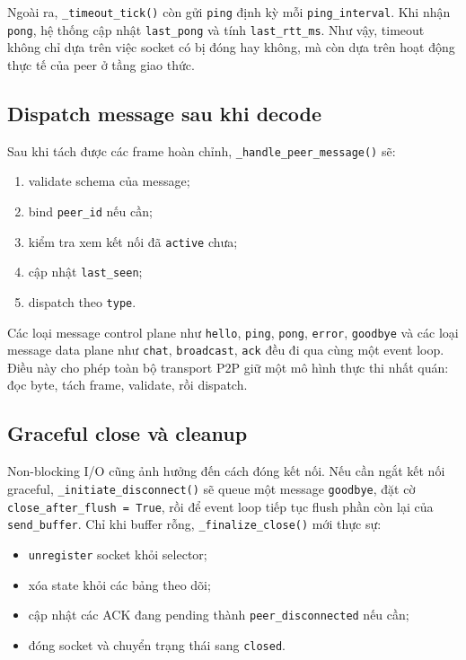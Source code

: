 Ngoài ra, \texttt{\_timeout\_tick()} còn gửi \texttt{ping} định kỳ mỗi \texttt{ping\_interval}. Khi nhận \texttt{pong}, hệ thống cập nhật \texttt{last\_pong} và tính \texttt{last\_rtt\_ms}. Như vậy, timeout không chỉ dựa trên việc socket có bị đóng hay không, mà còn dựa trên hoạt động thực tế của peer ở tầng giao thức.

\subsection{Dispatch message sau khi decode}
Sau khi tách được các frame hoàn chỉnh, \texttt{\_handle\_peer\_message()} sẽ:
\begin{enumerate}[leftmargin=2em]
    \item validate schema của message;
    \item bind \texttt{peer\_id} nếu cần;
    \item kiểm tra xem kết nối đã \texttt{active} chưa;
    \item cập nhật \texttt{last\_seen};
    \item dispatch theo \texttt{type}.
\end{enumerate}

Các loại message control plane như \texttt{hello}, \texttt{ping}, \texttt{pong}, \texttt{error}, \texttt{goodbye} và các loại message data plane như \texttt{chat}, \texttt{broadcast}, \texttt{ack} đều đi qua cùng một event loop. Điều này cho phép toàn bộ transport P2P giữ một mô hình thực thi nhất quán: đọc byte, tách frame, validate, rồi dispatch.

\subsection{Graceful close và cleanup}
Non-blocking I/O cũng ảnh hưởng đến cách đóng kết nối. Nếu cần ngắt kết nối graceful, \texttt{\_initiate\_disconnect()} sẽ queue một message \texttt{goodbye}, đặt cờ \texttt{close\_after\_flush = True}, rồi để event loop tiếp tục flush phần còn lại của \texttt{send\_buffer}. Chỉ khi buffer rỗng, \texttt{\_finalize\_close()} mới thực sự:
\begin{itemize}[leftmargin=2em]
    \item \texttt{unregister} socket khỏi selector;
    \item xóa state khỏi các bảng theo dõi;
    \item cập nhật các ACK đang pending thành \texttt{peer\_disconnected} nếu cần;
    \item đóng socket và chuyển trạng thái sang \texttt{closed}.
\end{itemize}

